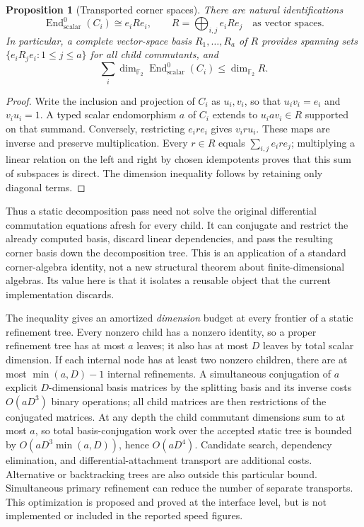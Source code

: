 \documentclass[11pt,a4paper]{article}
\newtheorem{proposition}[theorem]{Proposition}
\theoremstyle{definition}\newtheorem{definition}[theorem]{Definition}
\theoremstyle{remark}\newtheorem{remark}[theorem]{Remark}
\newcommand{\F}{\mathbb F_2}
\newcommand{\End}{\operatorname{End}}
\begin{document}
\begin{proposition}[Transported corner spaces]
\label{prop:corners}
There are natural identifications
\[
 \End^0_{\mathrm{scalar}}(C_i)\cong e_i R e_i,
 \qquad
 R=\bigoplus_{i,j}e_i R e_j
 \quad\text{as vector spaces}.
\]
In particular, a complete vector-space basis $R_1,\ldots,R_a$ of $R$
provides spanning sets $\{e_iR_j e_i:1\le j\le a\}$ for all child
commutants, and
\[
 \sum_i\dim_{\F}\End^0_{\mathrm{scalar}}(C_i)\le\dim_{\F}R.
\]
\end{proposition}
\begin{proof}
Write the inclusion and projection of $C_i$ as $u_i,v_i$, so that
$u_iv_i=e_i$ and $v_iu_i=1$. A typed scalar endomorphism $a$ of $C_i$
extends to $u_iav_i\in R$ supported on that summand. Conversely, restricting
$e_i r e_i$ gives $v_i r u_i$. These maps are inverse and preserve
multiplication. Every $r\in R$ equals $\sum_{i,j}e_i r e_j$; multiplying a
linear relation on the left and right by chosen idempotents proves that
this sum of subspaces is direct. The dimension inequality follows by
retaining only diagonal terms.
\end{proof}

Thus a static decomposition pass need not solve the original differential
commutation equations afresh for every child. It can conjugate and restrict
the already computed basis, discard linear dependencies, and pass the
resulting corner basis down the decomposition tree. This is an application
of a standard corner-algebra identity, not a new structural theorem about
finite-dimensional algebras. Its value here is that it isolates a reusable
object that the current implementation discards.

The inequality gives an amortized \emph{dimension} budget at every frontier
of a static refinement tree. Every nonzero child has a nonzero identity,
so a proper refinement tree has at most $a$ leaves; it also has at most
$D$ leaves by total scalar dimension. If each internal node has at least
two nonzero children, there are at most $\min(a,D)-1$ internal refinements.
A simultaneous conjugation of $a$ explicit $D$-dimensional basis matrices
by the splitting basis and its inverse costs $O(aD^3)$ binary operations;
all child matrices are then restrictions of the conjugated matrices.
At any depth the child commutant dimensions
sum to at most $a$, so total basis-conjugation work over the accepted
static tree is bounded by $O(aD^3\min(a,D))$, hence $O(aD^4)$.
Candidate search, dependency elimination, and differential-attachment
transport are additional costs. Alternative or backtracking trees are
also outside this particular bound.
Simultaneous primary refinement can reduce the number of separate
transports. This optimization is proposed and proved at the interface
level, but is not implemented or included in the reported speed figures.
\end{document}
